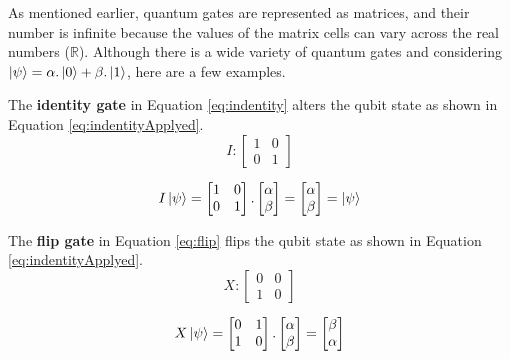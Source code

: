 			\par As mentioned earlier, quantum gates are represented as matrices, and their number is infinite because the values of the matrix cells can vary across the real numbers ($\mathbb{R}$). Although there is a wide variety of quantum gates and considering $\ket{\psi} = \alpha . \ket{0} + \beta . \ket{1}$, here are a few examples.\newline

		
			\par The \textbf{identity gate} in Equation \ref{eq:indentity} alters the qubit state as shown in Equation \ref{eq:indentityApplyed}.
			\begin{equation}
				\label{eq:indentity}
					I : 
					\begin{bmatrix}
						1& 0 \\
						0& 1
					\end{bmatrix}
			\end{equation}

			\begin{equation}
				\label{eq:indentityApplyed}
				I\ket{\psi} = \begin{bmatrix}
					1& 0 \\
					0& 1
				\end{bmatrix} . \begin{bmatrix}
					\alpha \\
					\beta
				\end{bmatrix} = \begin{bmatrix}
					\alpha \\
					\beta
				\end{bmatrix} = \ket{\psi}
			\end{equation}
		
			\par The \textbf{flip gate} in Equation \ref{eq:flip} flips the qubit state as shown in Equation \ref{eq:indentityApplyed}.
			\begin{equation}
				\label{eq:flip}
				X : 
				\begin{bmatrix}
					0& 0 \\
					1& 0
				\end{bmatrix}
			\end{equation}
			
			\begin{equation}
				\label{eq:flipApplyed}
				X\ket{\psi} = \begin{bmatrix}
					0& 1 \\
					1& 0
				\end{bmatrix} . \begin{bmatrix}
					\alpha \\
					\beta
				\end{bmatrix} = \begin{bmatrix}
					\beta \\
					\alpha
				\end{bmatrix}
			\end{equation}
		
